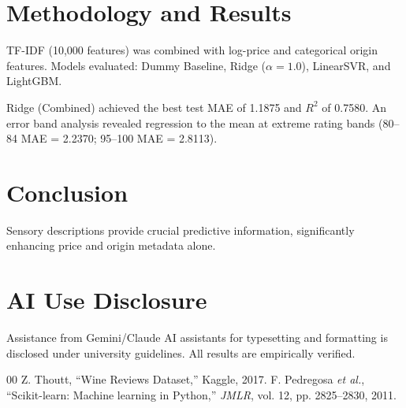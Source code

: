\documentclass[conference]{IEEEtran}
\begin{document}
\section{Methodology and Results}
TF-IDF (10,000 features) was combined with log-price and categorical origin features. Models evaluated: Dummy Baseline, Ridge ($\alpha=1.0$), LinearSVR, and LightGBM.

Ridge (Combined) achieved the best test MAE of 1.1875 and $R^2$ of 0.7580. An error band analysis revealed regression to the mean at extreme rating bands (80--84 MAE = 2.2370; 95--100 MAE = 2.8113).

\section{Conclusion}
Sensory descriptions provide crucial predictive information, significantly enhancing price and origin metadata alone.

\section*{AI Use Disclosure}
Assistance from Gemini/Claude AI assistants for typesetting and formatting is disclosed under university guidelines. All results are empirically verified.

\begin{thebibliography}{00}
 Z. Thoutt, ``Wine Reviews Dataset,'' Kaggle, 2017.
 F. Pedregosa \textit{et al.}, ``Scikit-learn: Machine learning in Python,'' \textit{JMLR}, vol. 12, pp. 2825--2830, 2011.
\end{thebibliography}
\end{document}
